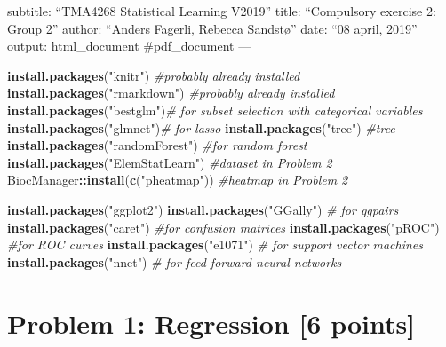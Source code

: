 \documentclass[]{article}
\title{}
\author{}
\date{}
\newenvironment{Shaded}{\begin{snugshade}}{\end{snugshade}}
\newcommand{\KeywordTok}[1]{\textcolor[rgb]{0.13,0.29,0.53}{\textbf{#1}}}
\newcommand{\StringTok}[1]{\textcolor[rgb]{0.31,0.60,0.02}{#1}}
\newcommand{\CommentTok}[1]{\textcolor[rgb]{0.56,0.35,0.01}{\textit{#1}}}
\newcommand{\OperatorTok}[1]{\textcolor[rgb]{0.81,0.36,0.00}{\textbf{#1}}}
\newcommand{\NormalTok}[1]{#1}
\begin{document}
subtitle: ``TMA4268 Statistical Learning V2019'' title: ``Compulsory
exercise 2: Group 2'' author: ``Anders Fagerli, Rebecca Sandstø'' date:
``08 april, 2019'' output: html\_document \#pdf\_document ---

\begin{Shaded}
\begin{Highlighting}[]
\KeywordTok{install.packages}\NormalTok{(}\StringTok{"knitr"}\NormalTok{) }\CommentTok{#probably already installed}
\KeywordTok{install.packages}\NormalTok{(}\StringTok{"rmarkdown"}\NormalTok{) }\CommentTok{#probably already installed}
\KeywordTok{install.packages}\NormalTok{(}\StringTok{"bestglm"}\NormalTok{)}\CommentTok{# for subset selection with categorical variables}
\KeywordTok{install.packages}\NormalTok{(}\StringTok{"glmnet"}\NormalTok{)}\CommentTok{# for lasso}
\KeywordTok{install.packages}\NormalTok{(}\StringTok{"tree"}\NormalTok{) }\CommentTok{#tree}
\KeywordTok{install.packages}\NormalTok{(}\StringTok{"randomForest"}\NormalTok{) }\CommentTok{#for random forest}
\KeywordTok{install.packages}\NormalTok{(}\StringTok{"ElemStatLearn"}\NormalTok{) }\CommentTok{#dataset in Problem 2}
\NormalTok{BiocManager}\OperatorTok{::}\KeywordTok{install}\NormalTok{(}\KeywordTok{c}\NormalTok{(}\StringTok{"pheatmap"}\NormalTok{)) }\CommentTok{#heatmap in Problem 2}
\end{Highlighting}
\end{Shaded}

\begin{Shaded}
\begin{Highlighting}[]
\KeywordTok{install.packages}\NormalTok{(}\StringTok{"ggplot2"}\NormalTok{)}
\KeywordTok{install.packages}\NormalTok{(}\StringTok{"GGally"}\NormalTok{) }\CommentTok{# for ggpairs}
\KeywordTok{install.packages}\NormalTok{(}\StringTok{"caret"}\NormalTok{) }\CommentTok{#for confusion matrices}
\KeywordTok{install.packages}\NormalTok{(}\StringTok{"pROC"}\NormalTok{) }\CommentTok{#for ROC curves}
\KeywordTok{install.packages}\NormalTok{(}\StringTok{"e1071"}\NormalTok{) }\CommentTok{# for support vector machines}
\KeywordTok{install.packages}\NormalTok{(}\StringTok{"nnet"}\NormalTok{) }\CommentTok{# for feed forward neural networks}
\end{Highlighting}
\end{Shaded}

\section{Problem 1: Regression {[}6
points{]}}\label{problem-1-regression-6-points}
\end{document}
